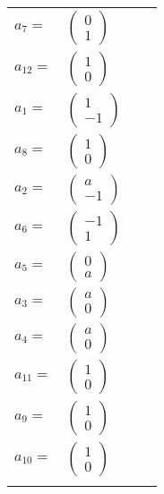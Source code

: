 \documentclass[1p]{elsarticle_modified}
\theoremstyle{definition}
\begin{document}
\begin{tabular}{m{7pt} m{180pt} m{7pt} m{180pt} }
\flushright $a_{7}=$&$\begin{pmatrix}0\\1\end{pmatrix}$ \\
\flushright $a_{12}=$&$\begin{pmatrix}1\\0\end{pmatrix}$ \\
\flushright $a_{1}=$&$\begin{pmatrix}1\\-1\end{pmatrix}$ \\
\flushright $a_{8}=$&$\begin{pmatrix}1\\0\end{pmatrix}$ \\
\flushright $a_{2}=$&$\begin{pmatrix}a\\-1\end{pmatrix}$ \\
\flushright $a_{6}=$&$\begin{pmatrix}-1\\1\end{pmatrix}$ \\
\flushright $a_{5}=$&$\begin{pmatrix}0\\a\end{pmatrix}$ \\
\flushright $a_{3}=$&$\begin{pmatrix}a\\0\end{pmatrix}$ \\
\flushright $a_{4}=$&$\begin{pmatrix}a\\0\end{pmatrix}$ \\
\flushright $a_{11}=$&$\begin{pmatrix}1\\0\end{pmatrix}$ \\
\flushright $a_{9}=$&$\begin{pmatrix}1\\0\end{pmatrix}$ \\
\flushright $a_{10}=$&$\begin{pmatrix}1\\0\end{pmatrix}$\\&\end{tabular}
\end{document}
